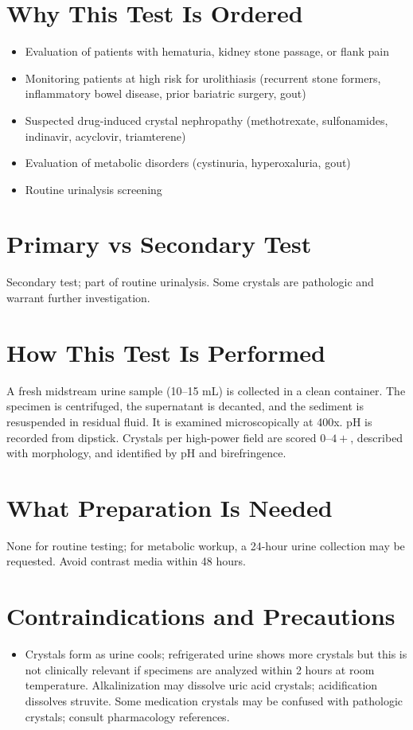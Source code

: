 \section*{Why This Test Is Ordered}
\begin{itemize}
  \item Evaluation of patients with hematuria, kidney stone passage, or flank pain \cite{pearle2014medical}
  \item Monitoring patients at high risk for urolithiasis (recurrent stone formers, inflammatory bowel disease, prior bariatric surgery, gout)
  \item Suspected drug-induced crystal nephropathy (methotrexate, sulfonamides, indinavir, acyclovir, triamterene) \cite{neumann2020druginduced}
  \item Evaluation of metabolic disorders (cystinuria, hyperoxaluria, gout)
  \item Routine urinalysis screening
\end{itemize}

\section*{Primary vs Secondary Test}
Secondary test; part of routine urinalysis. Some crystals are pathologic and warrant further investigation.

\section*{How This Test Is Performed}
A fresh midstream urine sample (10--15 mL) is collected in a clean container. The specimen is centrifuged, the supernatant is decanted, and the sediment is resuspended in residual fluid. It is examined microscopically at 400x. pH is recorded from dipstick. Crystals per high-power field are scored $0$--$4+$, described with morphology, and identified by pH and birefringence.

\section*{What Preparation Is Needed}
None for routine testing; for metabolic workup, a 24-hour urine collection may be requested. Avoid contrast media within 48 hours.

\section*{Contraindications and Precautions}
\begin{itemize}
  \item Crystals form as urine cools; refrigerated urine shows more crystals but this is not clinically relevant if specimens are analyzed within 2 hours at room temperature. Alkalinization may dissolve uric acid crystals; acidification dissolves struvite. Some medication crystals may be confused with pathologic crystals; consult pharmacology references.
\end{itemize}
